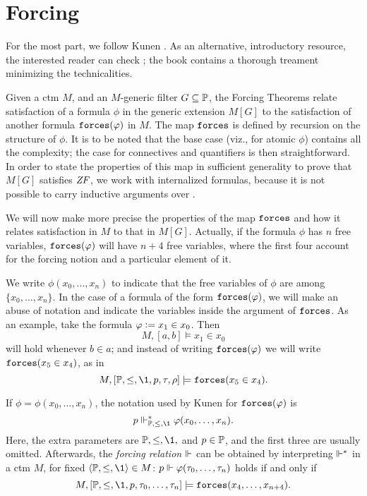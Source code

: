 \section{Forcing}
\label{sec:forcing}

For the most part, we follow Kunen \cite{kunen2011set}. As
an alternative, introductory 
resource, the  interested reader can check
\cite{chow-beginner-forcing}; the book \cite{weaver2014forcing}
contains a thorough treament minimizing the technicalities.

Given a ctm $M$, and an $M$-generic filter $G\subseteq\mathbb{P}$, the Forcing
Theorems relate satisfaction of a formula 
$\phi$ in the generic extension $M[G]$ to the satisfaction of another
formula $\mathop{\mathtt{forces}}(\varphi)$ in $M$. The map $\mathop{\mathtt{forces}}$ is defined by
recursion on 
the structure of $\phi$. It is to be noted that the base case (viz.,
for atomic $\phi$) contains all the complexity; the case for
connectives and quantifiers is then straightforward.
In order to state the properties of this map
in sufficient generality to prove that  $M[G]$ satisfies $\mathit{ZF}$, we work with
internalized formulas, because it is not possible to carry inductive
arguments over \tyo.

We will now make more precise the properties of the map
$\mathop{\mathtt{forces}}$ and how it relates satisfaction in $M$ to that in
$M[G]$. Actually, if the formula $\phi$ has $n$ free variables,
$\mathop{\mathtt{forces}}(\varphi)$ will have $n+4$ free variables, where the first four account
for the forcing notion and a particular element of it. 

We write $\phi(x_0,\dots,x_n)$ to indicate that the free variables of
$\phi$ are among $\{x_0,\dots,x_n\}$. In the case of a formula of the
form $\mathop{\mathtt{forces}}(\varphi)$, we will make an abuse of notation and indicate
the variables inside the argument of $\mathop{\mathtt{forces}}$. As an example, take
the formula $\varphi\mathrel{\mathop:}= x_1\in x_0$. Then
\[
M,[a,b] \models x_1\in x_0
\]
will hold whenever $b\in a$; and instead of writing $\mathop{\mathtt{forces}}(\varphi)$
we will write $\mathop{\mathtt{forces}}(x_5\in x_4)$, as in
\[
M,[\PP,\leq,\1,p,\tau,\rho] \models \forceisa(x_5\in x_4).
\]

If
$\phi=\phi(x_0,\dots,x_n)$, the notation used by Kunen
\cite{kunen2011set,kunen1980} for $\mathop{\mathtt{forces}}(\varphi)$ is 
\[
p\forces_{\PP,\leq,\1}^* \phi(x_0,\dots,x_n).
\]
Here, the extra parameters are $\PP,\leq,\1,$ and $p\in\mathbb{P}$, and the
first three are usually omitted. %
Afterwards, the \emph{forcing relation}
$\Vdash$ can be obtained by 
interpreting $\Vdash^*$ in a ctm $M$, for fixed
$\lb\PP,\leq,\1\rb\in M$: $p\Vdash \varphi(\tau_0,\dots,\tau_n)$ holds
if and only if
\begin{equation}\label{eq:3}
M,[\PP,\leq,\1,p,\tau_0,\dots,\tau_n]\models \forceisa(x_4,\dots,x_{n+4}).
\end{equation}

